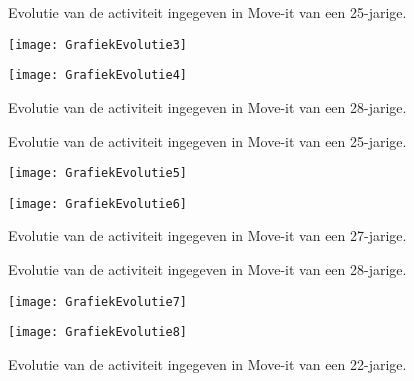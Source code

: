 \begin{figure}[htbp]
    \begin{minipage}[t]{0.48\linewidth} %
        \centering
        \caption[Evolutie van de activiteit van een 25-jarige]{Evolutie van de activiteit ingegeven in Move-it van een 25-jarige.}
        \texttt{[image: GrafiekEvolutie3]}
        \label{fig:evolutie3}
    \end{minipage}
    \hfill
    \begin{minipage}[t]{0.48\linewidth} %
        \centering
        \caption[Evolutie van de activiteit van een 28-jarige]{Evolutie van de activiteit ingegeven in Move-it van een 28-jarige.}
        \texttt{[image: GrafiekEvolutie4]}
        \label{fig:evolutie4}
    \end{minipage}
\end{figure}
\begin{figure}[htbp]
    \begin{minipage}[t]{0.48\linewidth} %
        \centering
        \caption[Evolutie van de activiteit van een 25-jarige]{Evolutie van de activiteit ingegeven in Move-it van een 25-jarige.}
        \texttt{[image: GrafiekEvolutie5]}
        \label{fig:evolutie5}
    \end{minipage}
    \hfill
    \begin{minipage}[t]{0.48\linewidth} %
        \centering
        \caption[Evolutie van de activiteit van een 27-jarige]{Evolutie van de activiteit ingegeven in Move-it van een 27-jarige.}
        \texttt{[image: GrafiekEvolutie6]}
        \label{fig:evolutie6}
    \end{minipage}
\end{figure}
\begin{figure}[htbp]
    \begin{minipage}[t]{0.48\linewidth} %
        \centering
        \caption[Evolutie van de activiteit van een 28-jarige]{Evolutie van de activiteit ingegeven in Move-it van een 28-jarige.}
        \texttt{[image: GrafiekEvolutie7]}
        \label{fig:evolutie7}
    \end{minipage}
    \hfill
    \begin{minipage}[t]{0.48\linewidth} %
        \centering
        \caption[Evolutie van de activiteit van een 22-jarige]{Evolutie van de activiteit ingegeven in Move-it van een 22-jarige.}
        \texttt{[image: GrafiekEvolutie8]}
        \label{fig:evolutie8}
    \end{minipage}
\end{figure}

